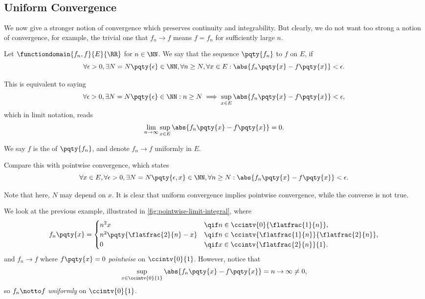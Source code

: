 \subsection{Uniform Convergence}

We now give a stronger notion of convergence which preserves continuity and integrability. But clearly, we do not want too strong a notion of convergence, for example, the trivial one that \(f_n \to f\) means \(f = f_n\) for sufficiently large \(n\).

\begin{definition}
    Let \(\functiondomain{f_n, f}{E}{\RR}\) for \(n \in \NN\). We say that the sequence \(\pqty{f_n}\)  to \(f\) on \(E\), if
    \[
        \forall \epsilon > 0, \exists N = N\pqty{\epsilon} \in \NN, \forall n \geq N, \forall x \in E: \abs{f_n\pqty{x} - f\pqty{x}} < \epsilon.
    \]

    This is equivalent to saying
    \[
        \forall \epsilon > 0, \exists N = N\pqty{\epsilon} \in \NN: n \geq N \implies \sup_{x \in E} \abs{f_n\pqty{x} - f\pqty{x}} < \epsilon,
    \]
    which in limit notation, reads
    \[
        \lim_{n \to \infty} \sup_{x \in E} \abs{f_n\pqty{x} - f\pqty{x}} = 0.
    \]

    We say \(f\) is the  of \(\pqty{f_n}\), and denote \(f_n \to f\) uniformly in \(E\).
\end{definition}

\begin{remark}
    Compare this with pointwise convergence, which states
    \[
        \forall x \in E, \forall \epsilon > 0, \exists N = N\pqty{\epsilon, x} \in \NN, \forall n \geq N: \abs{f_n\pqty{x} - f\pqty{x}} < \epsilon.
    \]

    Note that here, \(N\) may depend on \(x\). It is clear that uniform convergence implies pointwise convergence, while the converse is not true.
\end{remark}

\begin{example}
    We look at the previous example, illustrated in \autoref{fig:pointwise-limit-integral}, where
        \[
            f_n\pqty{x} = \begin{cases}
                n^2 x &\qif n \in \ccintv{0}{\flatfrac{1}{n}}, \\
                n^2 \pqty{\flatfrac{2}{n} - x} &\qif n \in \ccintv{\flatfrac{1}{n}}{\flatfrac{2}{n}}, \\
                0 &\qif x \in \ccintv{\flatfrac{2}{n}}{1}.
            \end{cases}
        \]
        and \(f_n \to f\) where \(f\pqty{x} = 0\) \emph{pointwise} on \(\ccintv{0}{1}\). However, notice that
        \[
            \sup_{x \in \ccintv{0}{1}} \abs{f_n\pqty{x} - f\pqty{x}} = n \to \infty \neq 0,
        \]
        so \(f_n \notto f\) \emph{uniformly} on \(\ccintv{0}{1}\).
\end{example}

